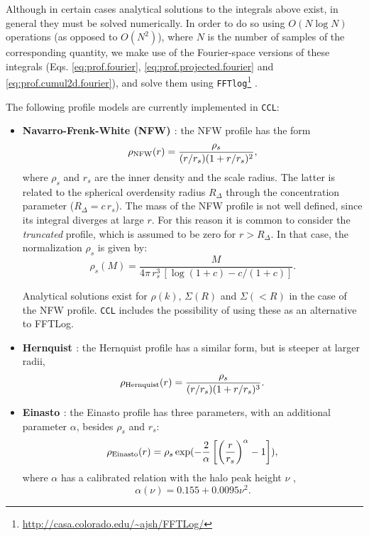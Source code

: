 \documentclass[\docopts]{\docclass}
\newcommand{\ccl}{{\tt CCL}\xspace}
\begin{document}
Although in certain cases analytical solutions to the integrals above exist, in general they must be solved numerically. In order to do so using $O(N\log N)$ operations (as opposed to $O(N^2)$), where $N$ is the number of samples of the corresponding quantity, we make use of the Fourier-space versions of these integrals (Eqs. \ref{eq:prof.fourier}, \ref{eq:prof.projected.fourier} and \ref{eq:prof.cumul2d.fourier}), and solve them using {\tt FFTlog}\footnote{\url{http://casa.colorado.edu/~ajsh/FFTLog/}}
\citep{Hamilton2000,Talman2009}.

The following profile models are currently implemented in \ccl:
\begin{itemize}
  \item {\bf Navarro-Frenk-White (NFW) \citep{Navarro1997}}: the NFW profile has the form
  \begin{equation}
    \rho_{\rm NFW}(r)=\frac{\rho_s}{(r/r_s)(1+r/r_s)^2},
  \end{equation}
  where $\rho_s$ and $r_s$ are the inner density and the scale radius. The latter is related to the spherical overdensity radius $R_\Delta$ through the concentration parameter ($R_\Delta=c\,r_s$). The mass of the NFW profile is not well defined, since its integral diverges at large $r$. For this reason it is common to consider the \emph{truncated} profile, which is assumed to be zero for $r>R_\Delta$. In that case, the normalization $\rho_s$ is given by:
  \begin{equation}
    \rho_s(M) = \frac{M}{4\pi\,r_s^3\,[\log(1+c) - c/(1+c)]}.
  \end{equation}

  Analytical solutions exist for $\rho(k)$, $\Sigma(R)$ and $\Sigma(<R)$ in the case of the NFW profile. \ccl includes the possibility of using these as an alternative to FFTLog.
  \item {\bf Hernquist \citep{Hernquist1990}}: the Hernquist profile has a similar form, but is steeper at larger radii,
  \begin{equation}
    \rho_{\rm Hernquist}(r)=\frac{\rho_s}{(r/r_s)(1+r/r_s)^3}.
  \end{equation}

  \item {\bf Einasto \citep{Einasto1965,Diemer2014}}: the Einasto profile has three parameters, with an additional parameter $\alpha$, besides $\rho_s$ and $r_s$:
  \begin{equation}
    \rho_{\rm Einasto}(r)=\rho_s\exp(-\frac{2}{\alpha}\left [  \left (  \frac{r}{r_s}\right )^\alpha-1\right ]),
  \end{equation}
  where $\alpha$ has a calibrated relation with the halo peak height $\nu$ \citep{Gao2008},
  \begin{equation}
    \alpha(\nu)=0.155+0.0095\nu^2.
  \end{equation}
\end{itemize}
\end{document}
